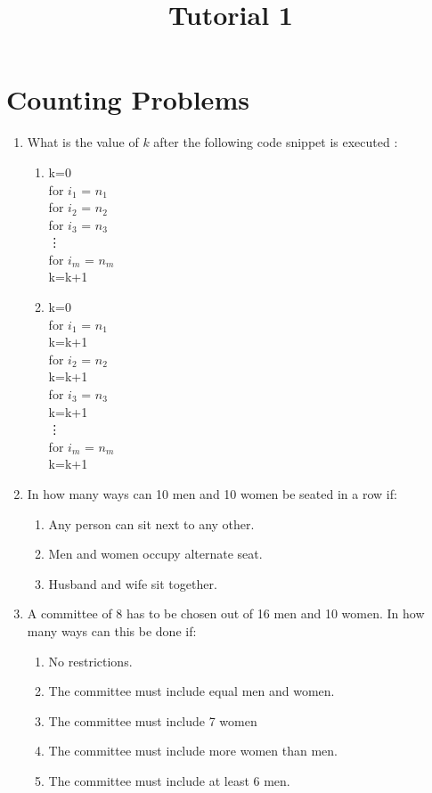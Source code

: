\documentclass[a4paper]{article}
\title{Tutorial 1}
\date{\displaydate{date}}
\newcommand\tab[1][1cm]{\hspace*{#1}}
\begin{document}
\maketitle
\section{Counting Problems}
\begin{enumerate}
\item What is the value of $k$ after the following code snippet is executed :
\begin{enumerate}[label=(\alph*)]
\item 
k=0\\
for $i_1$ = $n_1$\\
\tab for $i_2$ = $n_2$\\
\tab \tab for $i_3$ = $n_3$\\
\tab \tab \tab \vdots\\
\tab \tab \tab for $i_m$ = $n_m$\\
\tab \tab \tab \tab k=k+1

\item 
k=0\\
for $i_1$ = $n_1$\\
\tab k=k+1\\
\tab for $i_2$ = $n_2$\\
\tab \tab k=k+1\\
\tab \tab for $i_3$ = $n_3$\\
\tab \tab \tab k=k+1\\
\tab \tab \tab \vdots\\
\tab \tab \tab for $i_m$ = $n_m$\\
\tab \tab \tab \tab k=k+1\\ 
\end{enumerate}

\item In how many ways can 10 men and 10 women be seated in a row if:
\begin{enumerate}[label=(\alph*)]
\item Any person can sit next to any other.
\item Men and women occupy alternate seat.
\item Husband and wife sit together.
\end{enumerate}

\item A committee of 8 has to be chosen out of 16 men and 10 women. In how many ways can this be done if:
\begin{enumerate}[label=(\alph*)]
\item No restrictions.
\item The committee must include equal men and women.
\item The committee must include 7 women
\item The committee must include more women than men.
\item The committee must include at least 6 men.
\end{enumerate}


\end{enumerate}
\end{document}
